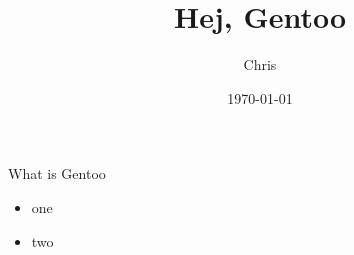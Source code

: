 \documentclass{beamer}
\date{\today}
\author{Chris}
\title{Hej, Gentoo}
\begin{document}
\begin{frame}
\titlepage
\end{frame}


\begin{frame}{What is Gentoo}


\begin{itemize}
\item one
\item two
\end{itemize}

\end{frame}
\end{document}
